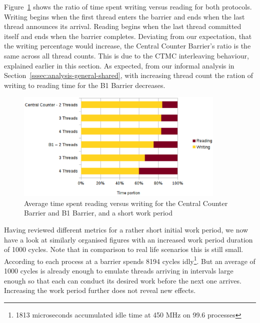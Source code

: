 \documentclass[a4paper, 10pt]{article}
\begin{document}
Figure~\ref{fig:c1-time-work-100-percent} shows the ratio of time spent writing versus reading for both protocols.
Writing begins when the first thread enters the barrier and ends when the last thread announces its arrival.
Reading begins when the last thread committed itself and ends when the barrier completes.
Deviating from our expectation, that the writing percentage would increase, the Central Counter Barrier's ratio is the same across all thread counts. This is due to the CTMC interleaving behaviour, explained earlier in this section.
As expected, from our informal analysis in Section~\ref{sssec:analysis-general-shared}, with increasing thread count the ration of writing to reading time for the B1 Barrier decreases.
\begin{figure}[htbp]
	\centering
	\includegraphics[width=10cm]{charts/c1-time-work-100-percent}
	\caption{Average time spent reading versus writing for the Central Counter Barrier and B1 Barrier, and a short work period}
	\label{fig:c1-time-work-100-percent}
\end{figure}

Having reviewed different metrics for a rather short initial work period, we now have a look at similarly organised figures with an increased work period duration of 1000 cycles. Note that in comparison to real life scenarios this is still small. According to \cite{rab00} each process at a barrier spends 8194 cycles idly\footnote{1813 microseconds accumulated idle time at 450 MHz on 99.6 processes}. But an average of 1000 cycles is already enough to emulate threads arriving in intervals large enough so that each can conduct its desired work before the next one arrives. Increasing the work period further does not reveal new effects.
\end{document}
